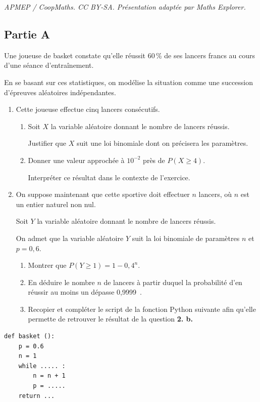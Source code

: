 \documentclass[10pt]{article}
\providecommand{\np}[2][]{{#2~#1}}
\begin{document}
\noindent\textit{APMEP / CoopMaths. CC BY-SA. Présentation adaptée par Maths Explorer.}\par\medskip
\subsection*{Partie A}

Une joueuse de basket constate qu'elle réussit 60\,\% de ses lancers francs au cours d'une séance d'entraînement.

En se basant sur ces statistiques, on modélise la situation comme une succession
d'épreuves aléatoires indépendantes.

\medskip

\begin{enumerate}
	\item Cette joueuse effectue cinq lancers consécutifs.
	\begin{enumerate}
		\item Soit $X$ la variable aléatoire donnant le nombre de lancers réussis.

		Justifier que $X$ suit une loi binomiale dont on précisera les paramètres.
		\item Donner une valeur approchée à $10^{-2}$ près de $P(X \geqslant 4)$.

		Interpréter ce résultat dans le contexte de l'exercice.
	\end{enumerate}
	\item On suppose maintenant que cette sportive doit effectuer $n$ lancers, où $n$ est un entier naturel non nul.

	Soit $Y$ la variable aléatoire donnant le nombre de lancers réussis.

	On admet que la variable aléatoire $Y$ suit la loi binomiale de paramètres $n$ et $p = 0,6$.
	\begin{enumerate}
		\item Montrer que $P(Y \geqslant 1)=1 - 0,4^n$.
		\item En déduire le nombre $n$ de lancers à partir duquel la probabilité d'en
		réussir au moins un dépasse \np{0,9999}.
		\item Recopier et compléter le script de la fonction Python suivante afin qu'elle
		permette de retrouver le résultat de la question \textbf{2. b.}
	\end{enumerate}
\end{enumerate}

\begin{lstlisting}[style=python,xleftmargin=0.3\linewidth,xrightmargin=0.3\linewidth,numbers=none]
def basket ():
	p = 0.6
	n = 1
	while ..... :
		n = n + 1
		p = .....
	return ...
\end{lstlisting}
\end{document}
